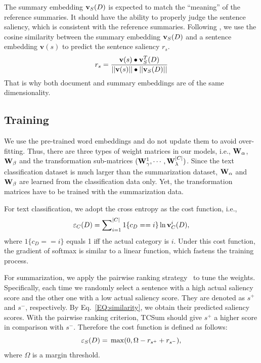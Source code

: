 \documentclass[letterpaper]{article}
\begin{document}
The summary embedding ${\bf{v}}_S(D)$ is expected to match the ``meaning'' of the reference summaries.
It should have the ability to properly judge the sentence saliency, which is consistent with the reference summaries.
Following \cite{kobayashi-noguchi-yatsuka:2015:EMNLP}, we use the cosine similarity between the summary embedding ${\bf{v}}_S(D)$ and a sentence embedding ${\mathbf{v}}(s)$ to predict the sentence saliency $r_s$.
\begin{equation} \label{EQ:similarity}
r_s= \frac{{{\bf{v}}(s) \bullet {\bf{v}}_S^T(D)}}{{||{\bf{v}}(s)|| \bullet ||{{\bf{v}}_S}(D)||}}
\end{equation}
That is why both document and summary embeddings are of the same dimensionality.

\subsection{Training}\label{SC:training}
We use the pre-trained word embeddings and do not update them to avoid over-fitting.
Thus, there are three types of weight matrices in our models, i.e., ${{\bf{W}}_\alpha }$, ${{\bf{W}}_\beta }$ and the transformation sub-matrices $({\bf{W}}_\gamma ^1, \cdots ,{\bf{W}}_\lambda ^{|C|})$.
Since the text classification dataset is much larger than the summarization dataset, ${{\bf{W}}_\alpha }$ and ${{\bf{W}}_\beta }$ are learned from the classification data only.
Yet, the transformation matrices have to be trained with the summarization data.

For text classification, we adopt the cross entropy as the cost function, i.e.,
\begin{equation}
{\varepsilon _C}(D) = \sum\nolimits_{i = 1}^{|C|} {1\{ c_D =  = i\} \ln {\bf{v}}_C^i(D)},
\end{equation}
where ${1\{ c_D =  = i\} }$ equals 1 iff the actual category is $i$.
Under this cost function, the gradient of softmax is similar to a linear function, which fastens the training process.

For summarization, we apply the pairwise ranking strategy~\cite{Collobert2011}  to tune the weights.
Specifically, each time we randomly select a sentence with a high actual saliency score and the other one with a low actual saliency score.
They are denoted as $s^+$ and $s^-$, respectively.
By Eq.~\ref{EQ:similarity}, we obtain their predicted saliency scores.
With the pairwise ranking criterion, TCSum should give $s^+$ a higher score in comparison with $s^-$.
Therefore the cost function is defined as follows:
\begin{equation} \label{eq:cost}
{\varepsilon _S}(D) = {\rm{ }}\max (0,\Omega  - r_{{s^ + }} + r_{{s^ - }}),
\end{equation}
where $\Omega$ is a margin threshold.
\end{document}
